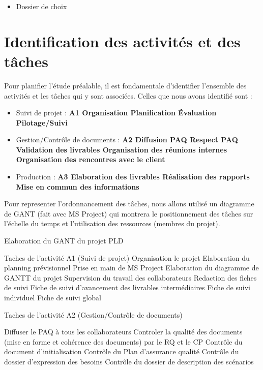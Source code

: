 {
\begin{itemize}
    \item Dossier de choix
\end{itemize}

\section{Identification des activités et des tâches}

Pour planifier l’étude préalable, il est fondamentale d’identifier l’ensemble des activités et les tâches qui y sont associées. Celles que nous avons identifié sont :
\begin{itemize}
    \item Suivi de projet : \bf{A1}
        \subitem Organisation
        \subitem Planification
        \subitem Évaluation
        \subitem Pilotage/Suivi

    \item Gestion/Contrôle de documents : \bf{A2}
        \subitem Diffusion PAQ
        \subitem Respect PAQ
        \subitem Validation des livrables
        \subitem Organisation des réunions internes
        \subitem Organisation des rencontres avec le client

    \item Production : \bf{A3}
        \subitem Elaboration des livrables
        \subitem Réalisation des rapports
        \subitem Mise en commun des informations
\end{itemize}

Pour representer l’ordonnancement des tâches, nous allons utilisé un diagramme de GANT (fait avec MS Project) qui montrera le positionnement des tâches sur l’échelle du temps et l’utilisation des ressources (membres du projet).


Elaboration du GANT du projet PLD

    Taches de l’activité A1 (Suivi de projet)
        Organisation le projet
        Elaboration du planning prévisionnel
        Prise en main de MS Project
        Elaboration du diagramme de GANTT du projet
        Supervision du travail des collaborateurs
        Redaction des fiches de suivi
            Fiche de suivi d’avancement des livrables intermédiaires
            Fiche de suivi individuel
            Fiche de suivi global


    Taches de l’activité A2 (Gestion/Contrôle de documents)

        Diffuser le  PAQ à tous les collaborateurs
        Controler la qualité des documents (mise en forme et cohérence des documents) par le RQ et le CP
            Contrôle du document d’initialisation
            Contrôle du Plan d’assurance qualité
            Contrôle du dossier d’expression des besoins
            Contrôle du dossier de description des scénarios

}
